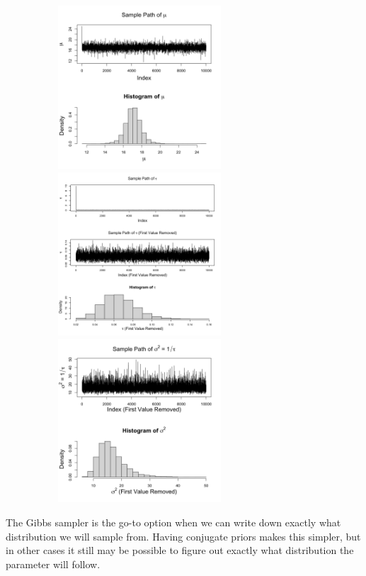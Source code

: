 \documentclass[11pt]{article}
\begin{document}
\begin{figure}[H]
\centering
\includegraphics[width=3.1in,height=2.4in]{bayes_figs/Plots_mu.png} %
\includegraphics[width=3.1in,height=2.4in]{bayes_figs/Plots_tau.png} %
\includegraphics[width=3.1in,height=2.4in]{bayes_figs/Plots_sigma.png} %
\end{figure}


The Gibbs sampler is the go-to option when we can write down exactly what distribution we will sample from. Having conjugate priors makes this simpler, but in other cases it still may be possible to figure out exactly what distribution the parameter will follow. 
\end{document}

